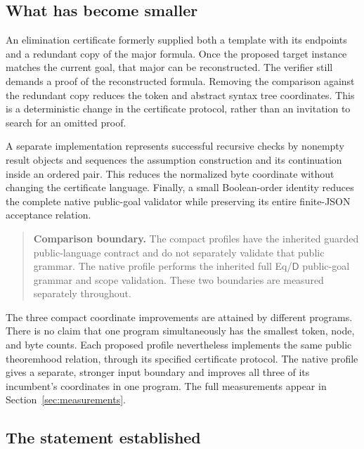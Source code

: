 \documentclass[11pt,letterpaper]{article}
\theoremstyle{definition}
\newcommand{\D}{\mathsf D}
\begin{document}
\subsection{What has become smaller}

An elimination certificate formerly supplied both a template with its
endpoints and a redundant copy of the major formula. Once the proposed
target instance matches the current goal, that major can be reconstructed.
The verifier still demands a proof of the reconstructed formula. Removing
the comparison against the redundant copy reduces the token and abstract
syntax tree coordinates. This is a deterministic change in the certificate
protocol, rather than an invitation to search for an omitted proof.

A separate implementation represents successful recursive checks by
nonempty result objects and sequences the assumption construction and its
continuation inside an ordered pair. This reduces the normalized byte
coordinate without changing the certificate language. Finally, a small
Boolean-order identity reduces the complete native public-goal validator
while preserving its entire finite-JSON acceptance relation.

\begin{quote}
\textbf{Comparison boundary.} The compact profiles have the inherited
guarded public-language contract and do not separately validate that
public grammar. The native profile performs the inherited full Eq/$\D$
public-goal grammar and scope validation. These two boundaries are measured
separately throughout.
\end{quote}

The three compact coordinate improvements are attained by different
programs. There is no claim that one program simultaneously has the
smallest token, node, and byte counts. Each proposed profile nevertheless
implements the same public theoremhood relation, through its specified
certificate protocol. The native profile gives a separate, stronger input
boundary and improves all three of its incumbent's coordinates in one
program. The full measurements appear in Section~\ref{sec:measurements}.

\subsection{The statement established}
\end{document}
